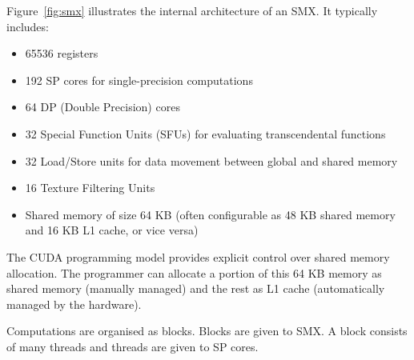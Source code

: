 \documentclass[12pt]{book}
\begin{document}
Figure~\ref{fig:smx} illustrates the internal architecture of an SMX. It typically includes:
\begin{itemize}
    \item 65536 registers
    \item 192 SP cores for single-precision computations
    \item 64 DP (Double Precision) cores
    \item 32 Special Function Units (SFUs) for evaluating transcendental functions
    \item 32 Load/Store units for data movement between global and shared memory
    \item 16 Texture Filtering Units
    \item Shared memory of size 64 KB (often configurable as 48 KB shared memory and 16 KB L1 cache, or vice versa)
\end{itemize}

The CUDA programming model provides explicit control over shared memory allocation. The programmer can allocate a portion of this 64 KB memory as shared memory (manually managed) and the rest as L1 cache (automatically managed by the hardware).

Computations are organised as blocks. Blocks are given to SMX. A block consists of many threads and threads are given to SP cores.
\end{document}
